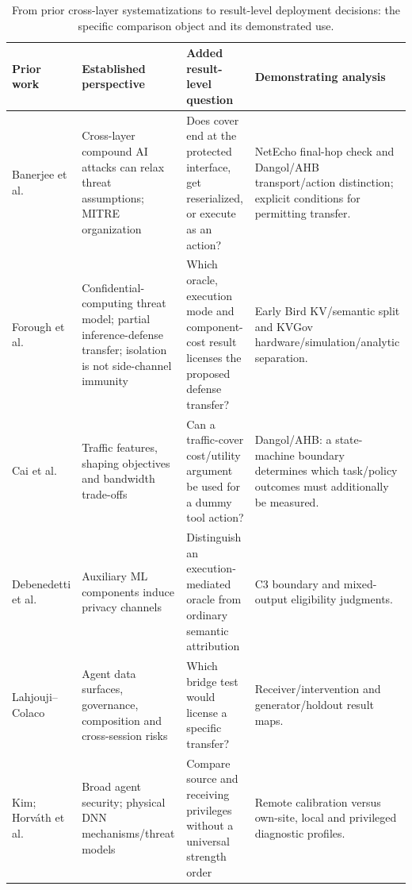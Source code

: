 \begin{table}[t]\centering\footnotesize
\caption{From prior cross-layer systematizations to result-level deployment decisions: the specific comparison object and its demonstrated use.}\label{tab:related-sok-matrix}
\begin{tabularx}{\textwidth}{@{}p{}YYY@{}}\toprule
Prior work & Established perspective & Added result-level question & Demonstrating analysis\\\midrule
Banerjee et al. \cite{banerjee2024compound} & Cross-layer compound AI attacks can relax threat assumptions; MITRE organization & Does cover end at the protected interface, get reserialized, or execute as an action? & NetEcho final-hop check and Dangol/AHB transport/action distinction; explicit conditions for permitting transfer.\\
Forough et al. \cite{forough2026secrets} & Confidential-computing threat model; partial inference-defense transfer; isolation is not side-channel immunity & Which oracle, execution mode and component-cost result licenses the proposed defense transfer? & Early Bird KV/semantic split and KVGov hardware/simulation/analytic separation.\\
Cai et al. \cite{cai2014systematic} & Traffic features, shaping objectives and bandwidth trade-offs & Can a traffic-cover cost/utility argument be used for a dummy tool action? & Dangol/AHB: a state-machine boundary determines which task/policy outcomes must additionally be measured.\\
Debenedetti et al. \cite{debenedetti2024privacy} & Auxiliary ML components induce privacy channels & Distinguish an execution-mediated oracle from ordinary semantic attribution & C3 boundary and mixed-output eligibility judgments.\\
Lahjouji--Colaco \cite{lahjouji2026datacentric} & Agent data surfaces, governance, composition and cross-session risks & Which bridge test would license a specific transfer? & Receiver/intervention and generator/holdout result maps.\\
Kim; Horv\'ath et al. \cite{kim2026agenticsok,horvath2024physical} & Broad agent security; physical DNN mechanisms/threat models & Compare source and receiving privileges without a universal strength order & Remote calibration versus own-site, local and privileged diagnostic profiles.\\\bottomrule
\end{tabularx}\end{table}
